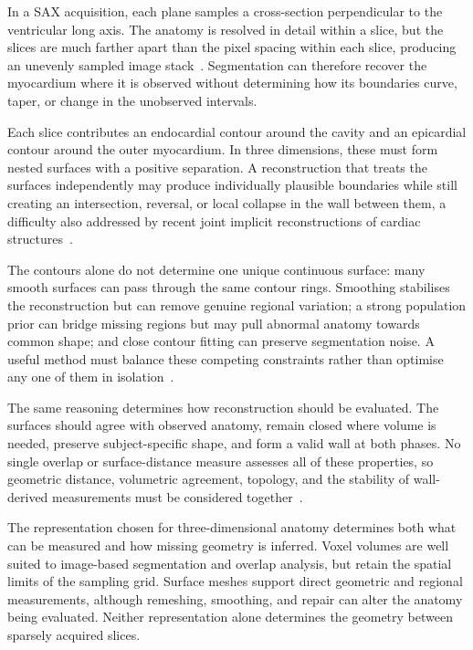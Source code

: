 In a SAX acquisition, each plane samples a cross-section perpendicular to the
ventricular long axis. The anatomy is resolved in detail within a slice, but
the slices are much farther apart than the pixel spacing within each slice,
producing an unevenly sampled image stack~\parencite{petitjean2011segmentationreview}. Segmentation can therefore
recover the myocardium where it is observed without determining how its
boundaries curve, taper, or change in the unobserved intervals.

Each slice contributes an endocardial contour around the cavity and an
epicardial contour around the outer myocardium. In three dimensions, these must
form nested surfaces with a positive separation. A reconstruction that treats
the surfaces independently may produce individually plausible boundaries while
still creating an intersection, reversal, or local collapse in the wall between
them, a difficulty also addressed by recent joint implicit reconstructions of
cardiac structures~\parencite{bras2026anisotropy}.

The contours alone do not determine one unique continuous surface: many smooth
surfaces can pass through the same contour rings. Smoothing stabilises the
reconstruction but can remove genuine regional variation; a strong population
prior can bridge missing regions but may pull abnormal anatomy towards common
shape; and close contour fitting can preserve segmentation noise. A useful
method must balance these competing constraints rather than optimise any one of
them in isolation~\parencite{petitjean2011segmentationreview,heimann2009ssmreview}.

The same reasoning determines how reconstruction should be evaluated. The
surfaces should agree with observed anatomy, remain closed where volume is
needed, preserve subject-specific shape, and form a valid wall at both phases.
No single overlap or surface-distance measure assesses all of these properties,
so geometric distance, volumetric agreement, topology, and the stability of
wall-derived measurements must be considered together~\parencite{heimann2009ssmreview,bras2026anisotropy}.

The representation chosen for three-dimensional anatomy determines both what
can be measured and how missing geometry is inferred. Voxel volumes are well
suited to image-based segmentation and overlap analysis, but retain the spatial
limits of the sampling grid. Surface meshes support direct geometric and
regional measurements, although remeshing, smoothing, and repair can alter the
anatomy being evaluated. Neither representation alone determines the geometry
between sparsely acquired slices.

